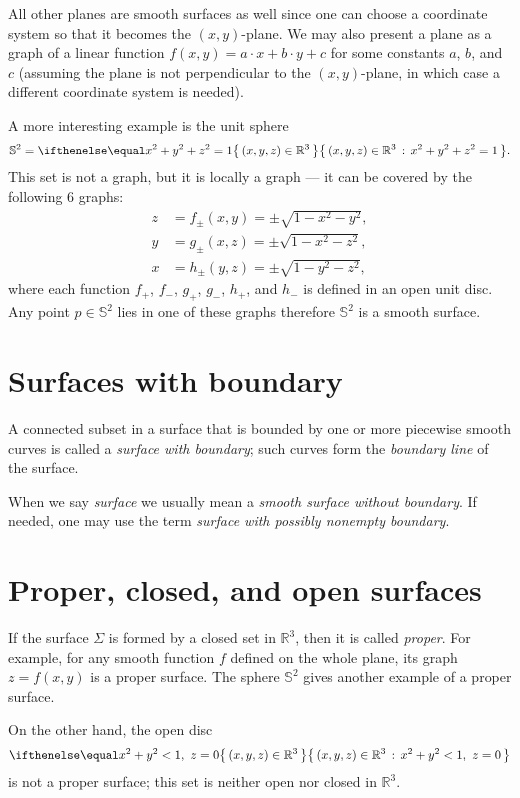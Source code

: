 All other planes are smooth surfaces as well since one can choose a coordinate system so that it becomes the $(x,y)$-plane.
We may also present a plane as a graph of a linear function 
$f(x,y)=a\cdot x+b\cdot y+c$ for some constants $a$, $b$, and $c$
(assuming the plane is not perpendicular to the $(x,y)$-plane, in which case a different coordinate system is needed).

A more interesting example is the unit sphere 
\[\mathbb{S}^2=\set{(x,y,z)\in\mathbb{R}^3}{x^2+y^2+z^2=1}.\]
This set is not a graph,
but it is locally a graph ---
it can be covered by the following 6 graphs:
\begin{align*}
z&=f_\pm(x,y)=\pm \sqrt{1-x^2-y^2},
\\
y&=g_\pm(x,z)=\pm \sqrt{1-x^2-z^2},
\\
x&=h_\pm(y,z)=\pm \sqrt{1-y^2-z^2},
\end{align*}
where each function $f_+$, $f_-$, $g_+$, $g_-$, $h_+$, and $h_-$ is defined in an open unit disc.
Any point $p\in\mathbb{S}^2$ lies in one of these graphs therefore $\mathbb{S}^2$ is a smooth surface.

\section{Surfaces with boundary}
A connected subset in a surface that is bounded by one or more piecewise
smooth curves is called a \emph{surface with boundary}; such curves form the \emph{boundary line} of the surface.

When we say {}\emph{surface} we usually mean a {}\emph{smooth surface without boundary}.
If needed, one may use the term {}\emph{surface with possibly nonempty boundary}.

\section{Proper, closed, and open surfaces}
If the surface $\Sigma$ is formed by a closed set in $\mathbb{R}^3$, then it is called \emph{proper}.
For example, for any smooth function $f$ defined on the whole plane, its graph $z=f(x,y)$ is a proper surface.
The sphere $\mathbb{S}^2$ gives another example of a proper surface.

On the other hand, the open disc 
\[\set{(x,y,z)\in\mathbb{R}^3}{x^2+y^2<1,\  z=0}\]
is not a proper surface; this set is neither open nor closed in $\mathbb{R}^3$.

